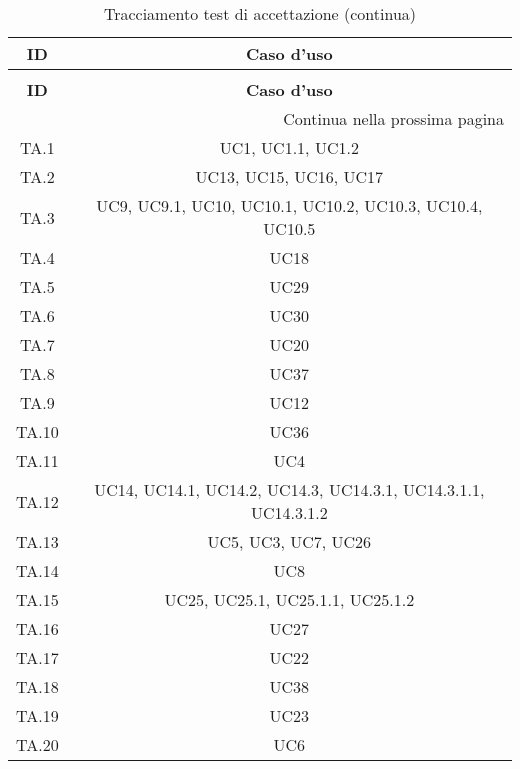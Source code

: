 \bgroup
\begin{adjustwidth}{-0.5cm}{-0.5cm}
	\centering
  \begin{longtable}{|c|c|}
		\caption{Tracciamento test di accettazione}
  	\label{tab:tracciamento-test-accettazione} \\
    \hline
		\textbf{ID} & \textbf{Caso d'uso} \\ 
		\hline
		\endfirsthead

		\caption[]{Tracciamento test di accettazione (continua)} \\
		\hline
		\textbf{ID} & \textbf{Caso d'uso} \\ 
		\hline
		\endhead

		\hline
		\multicolumn{2}{|r|}{{Continua nella prossima pagina}} \\ 
		\hline
		\endfoot

		\hline
		\endlastfoot

    TA.1 & UC1, UC1.1, UC1.2\\
		\hline TA.2 & UC13, UC15, UC16, UC17\\
		\hline TA.3 & UC9, UC9.1, UC10, UC10.1, UC10.2, UC10.3, UC10.4, UC10.5\\
		\hline TA.4 & UC18\\
		\hline TA.5 & UC29\\
		\hline TA.6 & UC30\\
		\hline TA.7 & UC20\\
		\hline TA.8 & UC37\\
		\hline TA.9 & UC12\\
		\hline TA.10 & UC36\\
		\hline TA.11 & UC4\\
		\hline TA.12 & UC14, UC14.1, UC14.2, UC14.3, UC14.3.1, UC14.3.1.1, UC14.3.1.2\\
		\hline TA.13 & UC5, UC3, UC7, UC26\\
		\hline TA.14 & UC8\\
		\hline TA.15 & UC25, UC25.1, UC25.1.1, UC25.1.2\\
		\hline TA.16 & UC27\\
		\hline TA.17 & UC22\\
		\hline TA.18 & UC38\\
		\hline TA.19 & UC23\\
		\hline TA.20 & UC6\\
  \end{longtable}
\end{adjustwidth}
\egroup